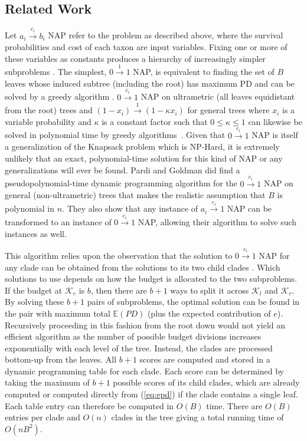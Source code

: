 \documentclass[10pt]{llncs}       \usepackage{graphicx,subfigure}
\begin{document}
\subsection{Related Work}

Let $a_i \xrightarrow{c_i} b_i$ NAP refer to the problem as described above,
where the survival probabilities and cost of each taxon are input variables.
Fixing one or more of these variables as constants 
produces a hierarchy of increasingly
simpler subproblems \cite{pardi07}.  The simplest, $0 \xrightarrow{1} 1$ NAP, 
is equivalent to finding the set of $B$ leaves whose induced subtree 
(including the root) has maximum PD and can be solved by a greedy
algorithm \cite{steel05} \cite{pardi05}. $0 \xrightarrow{c_i} 1$ NAP on
ultrametric (all leaves equidistant from the root)
 trees and $(1-x_i) \xrightarrow{1} (1 - \kappa x_i)$ for general
trees where $x_i$ is a variable probability and $\kappa$ is a 
constant factor such that $0 \leq \kappa \leq 1$ can likewise be 
solved in polynomial time by greedy algorithms~\cite{hartmann06}. 
Given that $0 \xrightarrow{c_i} 1$ NAP is itself a generalization
of the Knapsack problem which is NP-Hard, it is extremely unlikely that
an exact, polynomial-time solution for this kind of NAP or any generalizations
will ever be found.
Pardi and Goldman 
\cite{pardi07} did find a pseudopolynomial-time dynamic programming
algorithm for 
the $0 \xrightarrow{c_i} 1$ NAP on general (non-ultrametric) trees
that makes the realistic assumption that $B$ is polynomial in $n$.
They
also show that any instance of $a_i \xrightarrow{c_i} 1$ NAP can be
transformed to an instance of $0 \xrightarrow{c_i} 1$ NAP, allowing 
their algorithm to solve such instances as well.

This algorithm
 relies upon the observation that the solution to 
$0 \xrightarrow{c_i} 1$ NAP for any clade can be obtained from the solutions
to its two child clades \cite{pardi07}.  Which solutions to use depends on
how the budget is allocated to the two subproblems.  If the budget
at $\mathcal{K}_e$ is $b$, 
then there are $b+1$ ways to split it across $\mathcal{K}_l$ and 
$\mathcal{K}_r$.  
By solving these $b+1$
pairs of subproblems, the optimal solution can be found in the pair
with maximum total $\mathbb{E}(PD)$ 
(plus the expected contribution of $e$).  Recursively proceeding in this 
fashion from the root down
would not yield an efficient algorithm as the number of possible
budget divisions increases exponentially with each level of the tree.
Instead, the clades are processed bottom-up from the leaves.  All $b+1$
scores are computed and stored in a dynamic programming table for each clade.
Each score can be determined by taking the maximum of $b+1$ possible 
scores of its child clades, which are already computed or computed directly
from (\ref{eq:epd}) if the clade contains a single leaf.  Each table entry can 
therefore be 
computed in $O(B)$ time.  There are $O(B)$ entries per clade and $O(n)$
clades in the tree giving a total running time of $O(nB^2)$.
\end{document}

